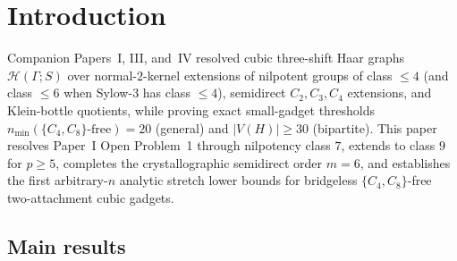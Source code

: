 \documentclass[11pt]{amsart}
\theoremstyle{remark}
\newcommand{\Haar}{\mathcal{H}}
\begin{document}
\maketitle

\section{Introduction}

Companion Papers~I, III, and~IV resolved cubic three-shift Haar graphs $\Haar(\Gamma; S)$ over normal-$2$-kernel extensions of nilpotent groups of class $\le 4$ (and class $\le 6$ when Sylow-$3$ has class $\le 4$), semidirect $C_2, C_3, C_4$ extensions, and Klein-bottle quotients, while proving exact small-gadget thresholds $n_{\min}(\{C_4, C_8\}\text{-free}) = 20$ (general) and $|V(H)| \ge 30$ (bipartite). This paper resolves Paper~I Open Problem~1 through nilpotency class $7$, extends to class $9$ for $p \ge 5$, completes the crystallographic semidirect order $m = 6$, and establishes the first arbitrary-$n$ analytic stretch lower bounds for bridgeless $\{C_4, C_8\}$-free two-attachment cubic gadgets.

\subsection{Main results}
\end{document}

